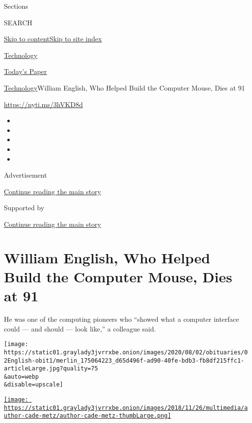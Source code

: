Sections

SEARCH

\protect\hyperlink{site-content}{Skip to
content}\protect\hyperlink{site-index}{Skip to site index}

\href{https://www.nytimes3xbfgragh.onion/section/technology}{Technology}

\href{https://myaccount.nytimes3xbfgragh.onion/auth/login?response_type=cookie\&client_id=vi}{}

\href{https://www.nytimes3xbfgragh.onion/section/todayspaper}{Today's
Paper}

\href{/section/technology}{Technology}\textbar{}William English, Who
Helped Build the Computer Mouse, Dies at 91

\href{https://nyti.ms/3hVKD8d}{https://nyti.ms/3hVKD8d}

\begin{itemize}
\item
\item
\item
\item
\item
\end{itemize}

Advertisement

\protect\hyperlink{after-top}{Continue reading the main story}

Supported by

\protect\hyperlink{after-sponsor}{Continue reading the main story}

\hypertarget{william-english-who-helped-build-the-computer-mouse-dies-at-91}{%
\section{William English, Who Helped Build the Computer Mouse, Dies at
91}\label{william-english-who-helped-build-the-computer-mouse-dies-at-91}}

He was one of the computing pioneers who ``showed what a computer
interface could --- and should --- look like,'' a colleague said.

\texttt{[image: https://static01.graylady3jvrrxbe.onion/images/2020/08/02/obituaries/02English-obit1/merlin\_175064223\_d65d496f-ad90-40fe-bdb3-fb8df215ffc1-articleLarge.jpg?quality=75\\\&auto=webp\\\&disable=upscale]}

\href{https://www.nytimes3xbfgragh.onion/by/cade-metz}{\texttt{[image: https://static01.graylady3jvrrxbe.onion/images/2018/11/26/multimedia/author-cade-metz/author-cade-metz-thumbLarge.png]}}

